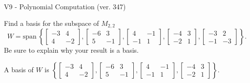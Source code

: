 \begin{exercise}
  \begin{exerciseTitle}V9 - Polynomial Computation (ver. 347)\end{exerciseTitle}
  \begin{exerciseStatement}
    Find a basis for the subspace of \(M_{2,2}\) 
\[W=\mathrm{span}\ \left\{\left[\begin{array}{cc}
-3 & 4 \\
4 & -2
\end{array}\right] , \left[\begin{array}{cc}
-6 & 3 \\
5 & -1
\end{array}\right] , \left[\begin{array}{cc}
4 & -1 \\
-1 & 1
\end{array}\right] , \left[\begin{array}{cc}
-4 & 3 \\
-2 & 1
\end{array}\right] , \left[\begin{array}{cc}
-3 & 2 \\
-1 & -3
\end{array}\right]\right\}.\]
 Be sure to explain why your result is a basis.


  \end{exerciseStatement}
  \begin{exerciseAnswer}
   A basis of \(W\) is  \(\left\{\left[\begin{array}{cc}
-3 & 4 \\
4 & -2
\end{array}\right] , \left[\begin{array}{cc}
-6 & 3 \\
5 & -1
\end{array}\right] , \left[\begin{array}{cc}
4 & -1 \\
-1 & 1
\end{array}\right] , \left[\begin{array}{cc}
-4 & 3 \\
-2 & 1
\end{array}\right]\right\}\).
  


  \end{exerciseAnswer}
\end{exercise}